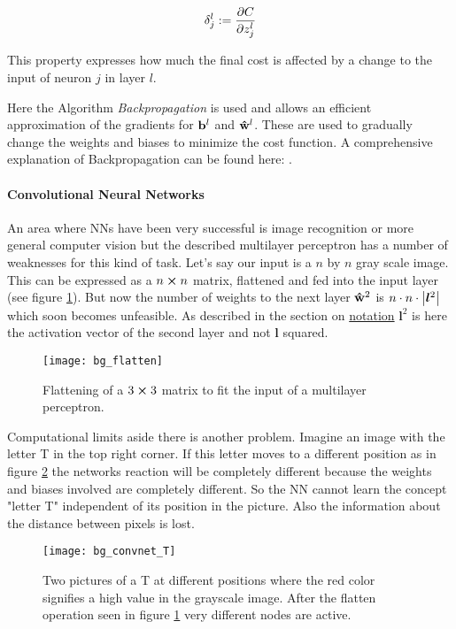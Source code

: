 \begin{equation}
    \delta^l_j := \pdv{C}{z^l_j}
\end{equation}

This property expresses how much the final cost is affected by a change to the input of neuron $j$ in layer $l$.

Here the Algorithm \textit{Backpropagation} is used and allows an efficient approximation of the gradients for $\vb{b}^l$ and $\vu{w}^l$. These are used to gradually change the weights and biases to minimize the cost function. A comprehensive explanation of Backpropagation can be found here: \cite{backprop}.

\paragraph{Convolutional Neural Networks}
An area where NNs have been very successful is image recognition or more general computer vision but the described multilayer perceptron has a number of weaknesses for this kind of task. Let's say our input is a $n$ by $n$ gray scale image. This can be expressed as a $n \cp n$ matrix, flattened and fed into the input layer (see figure \ref{fig:bg:flatten}). But now the number of weights to the next layer $\vu{w}^2$ is $n \cdot n \cdot \qty| \boldsymbol l^2|$
which soon becomes unfeasible. As described in the section on \hyperref[sec:notation]{notation} $\boldsymbol l^2$ is here the activation vector of the second layer and not $\boldsymbol l$ squared.

\begin{figure}[H]
    \centering
    \texttt{[image: bg\_flatten]}
    \caption{Flattening of a $3\cp3$ matrix to fit the input of a multilayer perceptron.}
    \label{fig:bg:flatten}
\end{figure}

Computational limits aside there is another problem. Imagine an image with the letter T in the top right corner. If this letter moves to a different position as in figure \ref{fig:bg:convnet_T} the networks reaction will be completely different because the weights and biases involved are completely different. So the NN cannot learn the concept "letter T" independent of its position in the picture. Also the information about the distance between pixels is lost.

\begin{figure}[H]
    \centering
    \texttt{[image: bg\_convnet\_T]}
    \caption{Two pictures of a T at different positions where the red color signifies a high value in the grayscale image. After the flatten operation seen in figure \ref{fig:bg:flatten} very different nodes are active.}
    \label{fig:bg:convnet_T}
\end{figure}

